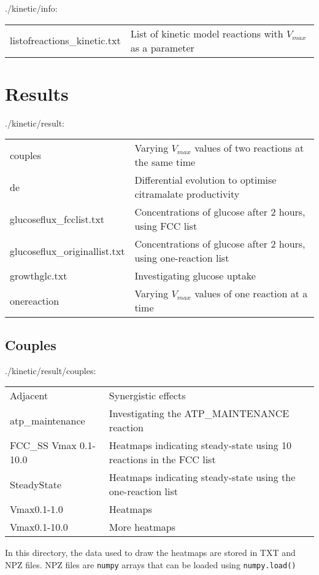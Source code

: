 \documentclass[a4paper, parskip=full]{scrreprt}
\begin{document}
./kinetic/info:

\begin{tabularx}{\linewidth}{LL}
listofreactions\_kinetic.txt & List of kinetic model reactions with $V_{max}$ as a parameter
\end{tabularx}

\section{Results}
\label{sec:kinresult}

./kinetic/result:

\begin{tabularx}{\linewidth}{LL}
couples & Varying $V_{max}$ values of two reactions at the same time\\
de & Differential evolution to optimise citramalate productivity\\
glucoseflux\_fcclist.txt & Concentrations of glucose after 2 hours, using FCC list\\
glucoseflux\_originallist.txt & Concentrations of glucose after 2 hours, using one-reaction list\\
growthglc.txt & Investigating glucose uptake\\
onereaction & Varying $V_{max}$ values of one reaction at a time
\end{tabularx}

\subsection{Couples}
\label{ssec:couples}

./kinetic/result/couples:

\begin{tabularx}{\linewidth}{LL}
Adjacent & Synergistic effects\\
atp\_maintenance & Investigating the ATP\_MAINTENANCE reaction\\
FCC\_SS Vmax 0.1-10.0 & Heatmaps indicating steady-state using 10 reactions in the FCC list\\
SteadyState & Heatmaps indicating steady-state using the one-reaction list\\
Vmax0.1-1.0 & Heatmaps\\
Vmax0.1-10.0 & More heatmaps
\end{tabularx}

In this directory, the data used to draw the heatmaps are stored in TXT and NPZ files. NPZ files are \texttt{numpy} arrays that can be loaded using \texttt{numpy.load()}
\end{document}
